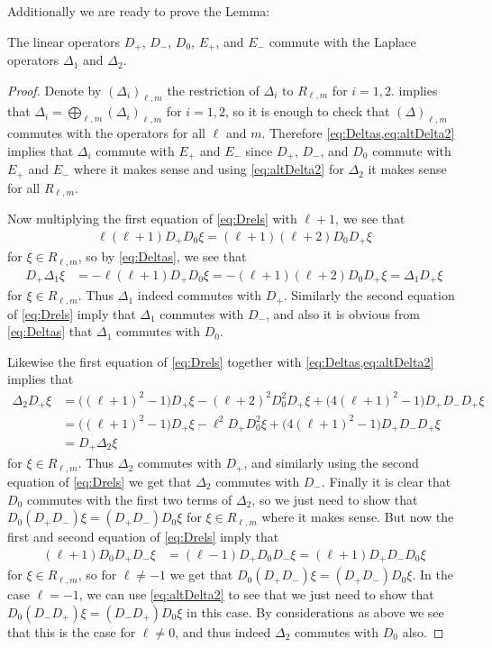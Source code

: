 Additionally we are ready to prove the Lemma:
\begin{lemma}\label{lem:commuteDeltas}
  The linear operators $D_+$, $D_-$, $D_0$, $E_+$, and $E_-$ commute with the Laplace operators $\Delta_1$ and $\Delta_2$. 
\end{lemma}
\begin{proof}
  Denote by $(\Delta_i)_{\ell,m}$ the restriction of $\Delta_i$ to $R_{\ell,m}$ for $i=1,2$.  implies that $\Delta_i=\bigoplus_{\ell,m} (\Delta_i)_{\ell,m}$ for $i=1,2$, so it is enough to check that $(\Delta)_{\ell,m}$ commutes with the operators for all $\ell$ and $m$. Therefore \cref{eq:Deltas,eq:altDelta2} implies that $\Delta_i$ commute with $E_+$ and $E_-$ since $D_+$, $D_-$, and $D_0$ commute with $E_+$ and $E_-$ where it makes sense and using \cref{eq:altDelta2} for $\Delta_2$ it makes sense for all $R_{\ell,m}$.

  Now multiplying the first equation of \cref{eq:Drels} with $\ell+1$, we see that
  \begin{align*}
    \ell(\ell+1)D_+D_0\xi = (\ell+1)(\ell+2)D_0D_+ \xi
  \end{align*}
  for $\xi\in R_{\ell,m}$, so by \cref{eq:Deltas}, we see that
  \begin{align*}
    D_+\Delta_1 \xi &= -\ell(\ell+1)D_+D_0 \xi = -(\ell+1)(\ell+2)D_0D_+ \xi = \Delta_1 D_+ \xi
  \end{align*}
  for $\xi\in R_{\ell,m}$. Thus $\Delta_1$ indeed commutes with $D_+$. Similarly the second equation of \cref{eq:Drels} imply that $\Delta_1$ commutes with $D_-$, and also it is obvious from \cref{eq:Deltas} that $\Delta_1$ commutes with $D_0$.

  Likewise the first equation of \cref{eq:Drels} together with \cref{eq:Deltas,eq:altDelta2} implies that
  \begin{align*}
    \Delta_2 D_+ \xi &= \bigl((\ell+1)^2-1\bigr)D_+\xi - (\ell+2)^2D_0^2D_+\xi + \bigl(4(\ell+1)^2-1\bigr)D_+D_-D_+\xi \\
                     &= \bigl((\ell+1)^2-1\bigr)D_+\xi - \ell^2D_+D_0^2\xi + \bigl(4(\ell+1)^2-1\bigr)D_+D_-D_+\xi \\
                     &= D_+\Delta_2 \xi
  \end{align*}
  for $\xi\in R_{\ell,m}$. Thus $\Delta_2$ commutes with $D_+$, and similarly using the second equation of \cref{eq:Drels} we get that $\Delta_2$ commutes with $D_-$. Finally it is clear that $D_0$ commutes with the first two terms of $\Delta_2$, so we just need to show that $D_0(D_+D_-)\xi=(D_+D_-)D_0\xi$ for $\xi\in R_{\ell,m}$ where it makes sense. But now the first and second equation of \cref{eq:Drels} imply that
  \begin{align*}
    (\ell+1)D_0D_+D_-\xi &= (\ell-1)D_+D_0D_-\xi = (\ell+1) D_+D_-D_0\xi
  \end{align*}
  for $\xi\in R_{\ell,m}$, so for $\ell\neq -1$ we get that $D_0(D_+D_-)\xi=(D_+D_-)D_0\xi$. In the case $\ell=-1$, we can use \cref{eq:altDelta2} to see that we just need to show that $D_0(D_-D_+)\xi=(D_-D_+)D_0\xi$ in this case. By considerations as above we see that this is the case for $\ell\neq 0$, and thus indeed $\Delta_2$ commutes with $D_0$ also.
\end{proof}

